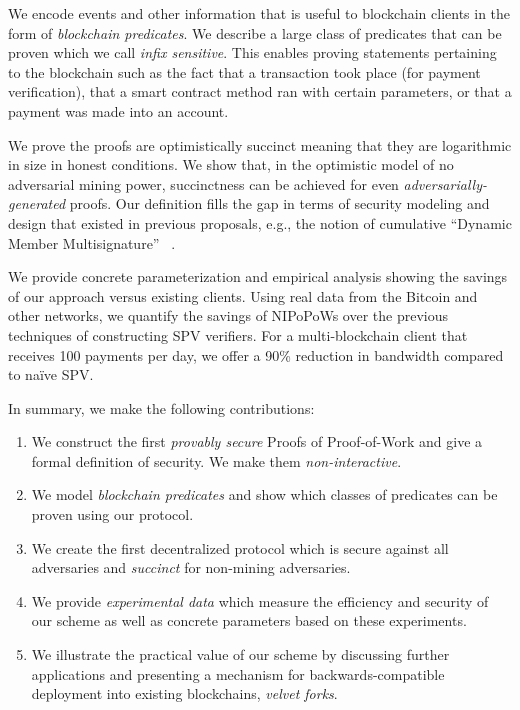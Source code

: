 We encode events and other information that is useful to blockchain clients in
the form of \emph{blockchain predicates}. We describe a large class of
predicates that can be proven which we call \emph{infix sensitive}. This enables
proving statements pertaining to the blockchain such as the fact that a
transaction took place (for payment verification), that a smart contract method
ran with certain parameters, or that a payment was made into an account.

We prove the proofs are optimistically succinct meaning that they are
logarithmic in size in honest conditions. We show that, in the optimistic model
of no adversarial mining power, succinctness can be achieved for even
\emph{adversarially-generated} proofs. Our definition fills the gap in terms of
security modeling and design that existed in previous proposals, e.g., the
notion of cumulative ``Dynamic Member Multisignature'' ~\cite{sidechains}.

We provide concrete parameterization and empirical analysis showing the savings
of our approach versus existing clients. Using real data from the Bitcoin and
other networks, we quantify the savings of NIPoPoWs over the previous techniques
of constructing SPV verifiers. For a multi-blockchain client that receives 100
payments per day, we offer a 90\% reduction in bandwidth compared to na\"ive
SPV.


In summary, we make the following contributions:
\begin{enumerate}
  \item We construct the first \emph{provably secure} Proofs of Proof-of-Work
        and give a formal definition of security. We make them
        \emph{non-interactive}.
  \item We model \emph{blockchain predicates} and show which classes of
        predicates can be proven using our protocol.
  \item We create the first decentralized protocol which is secure against all
        adversaries and \emph{succinct} for non-mining adversaries.
  \item We provide \emph{experimental data} which measure the efficiency and
        security of our scheme as well as concrete parameters based on these
        experiments.
  \item We illustrate the practical value of our scheme by discussing further
        applications and presenting a mechanism for backwards-compatible
        deployment into existing blockchains, \emph{velvet forks}.
\end{enumerate}

